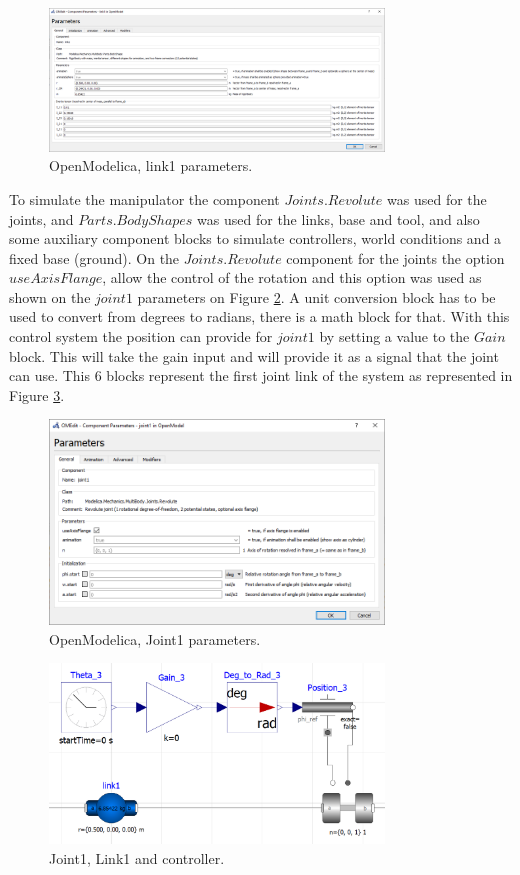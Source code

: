 \documentclass[transmag]{IEEEtran}
\begin{document}
\begin{figure}
\centerline{\includegraphics[width=3.5in]{./images/Link1Parameters}}
\caption{OpenModelica, link1 parameters.\label{Link1Parameters}}
\end{figure}
 
To simulate the manipulator the component $Joints.Revolute$ was used for the joints, and $Parts.BodyShapes$ was used for the links, base and tool, and also some auxiliary component blocks to simulate controllers, world conditions and a fixed base (ground).
On the $Joints.Revolute$ component for the joints the option $useAxisFlange$, allow the control of the rotation and this option was used as shown on the $joint1$ parameters on Figure \ref{Joint1Parameters}. 
A unit conversion block has to be used to convert from degrees to radians, there is a math block for that. 
With this control system the position can provide for $joint1$ by setting a value to the $Gain$ block. This will take the gain input and will provide it as a signal that the joint can use. This 6 blocks represent the first joint link of the system as represented in Figure \ref{Joint1Link1+Controller}.



\begin{figure}
\centerline{\includegraphics[width=3.5in]{./images/Joint1Parameters}}
\caption{OpenModelica, Joint1 parameters.\label{Joint1Parameters}}
\end{figure}

\begin{figure}
\centerline{\includegraphics[width=3.5in]{./images/Joint1Link1+Controller}}
\caption{Joint1, Link1 and controller.\label{Joint1Link1+Controller}}
\end{figure}
\end{document}
